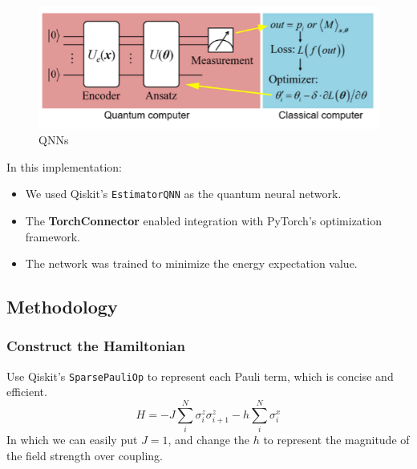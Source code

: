 \documentclass[pre,twocolumn,floatfix]{revtex4-1}
\begin{document}
\begin{figure}[H]
    \centering
    \includegraphics[width=0.5\linewidth]{images/QNN.png}
    \caption{QNNs}
    \label{3}
\end{figure}

In this implementation:
\begin{itemize}
    \item We used Qiskit's \verb|EstimatorQNN| as the quantum neural network.
    \item The \textbf{TorchConnector} enabled integration with PyTorch's optimization framework.
    \item The network was trained to minimize the energy expectation value.
\end{itemize}

\subsection{Methodology}
\subsubsection{Construct the Hamiltonian}
Use Qiskit's \verb|SparsePauliOp| to represent each Pauli term, which is concise and efficient.
    \begin{equation}
         H=-J\sum_i^N\sigma_i^{z}\sigma_{i+1}^{z}-h\sum_i^N\sigma_i^x
    \end{equation}
In which we can easily put $J=1$, and change the $h$ to represent the magnitude of the field strength over coupling.
\end{document}
